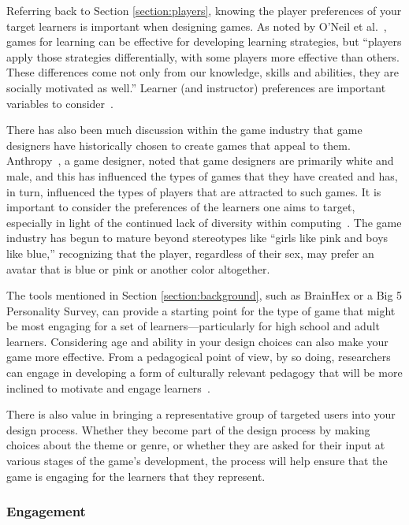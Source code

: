 \documentclass{sig-alternate-05-2015}
\begin{document}
Referring back to Section \ref{section:players}, knowing the player preferences of your target learners is important when designing games. As noted by O'Neil et al.~\cite{oneil05classification}, games for learning can be effective for developing learning strategies, but ``players apply those strategies differentially, with some players more effective than others. These differences come not only from our knowledge, skills and abilities, they are socially motivated as well.'' Learner (and instructor) preferences are important variables to consider~\cite{hainey2010using}.



There has also been much discussion within the game industry that game designers have historically chosen to create games that appeal to them. Anthropy~\cite{sheffield12token}, a game designer, noted that game designers are primarily white and male, and this has influenced the types of games that they have created and has, in turn, influenced the types of players that are attracted to such games. It is important to consider the preferences of the learners one aims to target, especially in light of the continued lack of diversity within computing~\cite{national13women}. The game industry has begun to mature beyond stereotypes like ``girls like pink and boys like blue,'' recognizing that the player, regardless of their sex, may prefer an avatar that is blue or pink or another color altogether. 



The tools mentioned in Section \ref{section:background}, such as BrainHex or a Big 5 Personality Survey, can provide a starting point for the type of game that might be most engaging for a set of learners---particularly for high school and adult learners. Considering age and ability in your design choices can also make your game more effective. From a pedagogical point of view, by so doing, researchers can engage in developing a form of culturally relevant pedagogy that will be more inclined to motivate and engage learners~\cite{ladson1995toward}.



There is also value in bringing a representative group of targeted users into your design process. Whether they become part of the design process by making choices about the theme or genre, or whether they are asked for their input at various stages of the game's development, the process will help ensure that the game is engaging for the learners that they represent. \subsubsection{Engagement}
\end{document}
